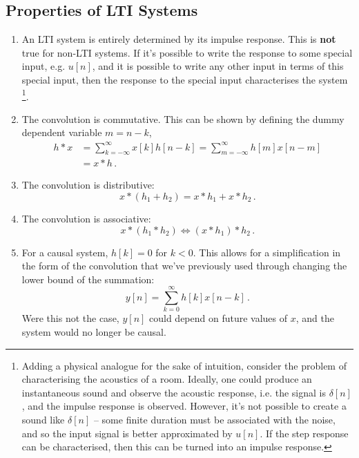 \subsection{Properties of LTI Systems}
%
\begin{enumerate}
\item An LTI system is entirely determined by its impulse response. This is \textbf{not} true
  for non-LTI systems. If it's possible to write the response to some special input, e.g. $u[n]$,
  and it is possible to write any other input in terms of this special input, then the response
  to the special input characterises the system
  \footnote{
    Adding a physical analogue for the sake of intuition, consider the problem of characterising
    the acoustics of a room. Ideally, one could produce an instantaneous sound and observe
    the acoustic response, i.e. the signal is $\delta[n]$, and the impulse response is observed.
    However, it's not possible to create a sound like $\delta[n]$ -- some finite duration must
    be associated with the noise, and so the input signal is better approximated by $u[n]$. If the
    step response can be characterised, then this can be turned into an impulse response.
  }.\\
\item The convolution is commutative. This can be shown by defining the dummy dependent variable
  $m = n - k$,
  \begin{align*}
    h * x &= \sum_{k=-\infty}^\infty x[k] h[n-k] = \sum_{m=-\infty}^\infty h[m] x[n-m] \\
    &= x * h \,.
  \end{align*}
\item The convolution is distributive:
  \begin{displaymath}
    x * (h_1 + h_2) = x * h_1 + x * h_2 \,.
  \end{displaymath}
\item The convolution is associative:
  \begin{displaymath}
    x * (h_1 * h_2) \Longleftrightarrow (x * h_1) * h_2 \,.
  \end{displaymath}
\item For a causal system, $h[k] = 0$ for $k < 0$. This allows for a simplification in the
  form of the convolution that we've previously used through changing the lower bound of
  the summation:
  \begin{equation}
    y[n] = \sum_{k=0}^\infty h[k]x[n-k] \,.
  \end{equation}
  Were this not the case, $y[n]$ could depend on future values of $x$, and the system would no
  longer be causal.
\end{enumerate}
